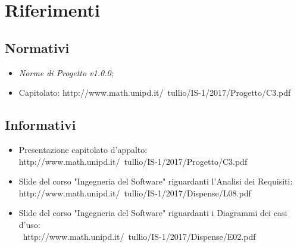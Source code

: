 \documentclass[./AnalisideiRequisiti.tex]{subfiles}
\begin{document}
\section{Riferimenti}
\subsection{Normativi}
\begin{itemize}
	\item \textit{Norme di Progetto v1.0.0};
	\item Capitolato: http://www.math.unipd.it/~tullio/IS-1/2017/Progetto/C3.pdf
\end{itemize}
\subsection{Informativi}
\begin{itemize}
	\item Presentazione capitolato d'appalto: \\ http://www.math.unipd.it/~tullio/IS-1/2017/Progetto/C3.pdf
	\item Slide del corso "Ingegneria del Software" riguardanti l'Analisi dei Requisiti: \\ http://www.math.unipd.it/~tullio/IS-1/2017/Dispense/L08.pdf
	\item Slide del corso "Ingegneria del Software" riguardanti i Diagrammi dei casi d'uso: \\\ http://www.math.unipd.it/~tullio/IS-1/2017/Dispense/E02.pdf
\end{itemize}
\end{document}
